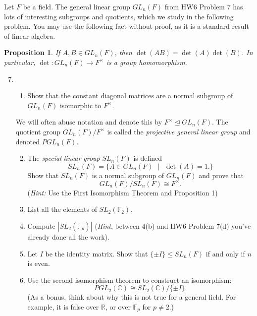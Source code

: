 \documentclass[11pt]{article}
\newtheorem{proposition}{Proposition}
\newcommand{\bC}{\mathbb{C}}
\newcommand{\bF}{\mathbb{F}}
\newcommand{\bR}{\mathbb{R}}
\begin{document}
 Let $F$ be a field.  The general linear group $GL_n(F)$ from HW6 Problem 7 has lots of interesting subgroups and quotients, which we study in the following problem.  You may use the following fact without proof, as it is a standard result of linear algebra.
 \begin{proposition}
  If $A,B\in GL_n(F)$, then $\det(AB)=\det(A)\det(B)$.  In particular, $\det:GL_n(F)\to F^\times$ is a group homomorphism.
\end{proposition}
\begin{enumerate}
\setcounter{enumi}{6}
   \item
  \begin{enumerate}
    \item Show that the constant diagonal matrices are a normal subgroup of $GL_n(F)$ isomorphic to $F^\times$.
  \end{enumerate}
  We will often abuse notation and denote this by $F^\times\unlhd GL_n(F)$.  The quotient group $GL_n(F)/F^\times$ is called the \textit{projective general linear group} and denoted $PGL_n(F)$.
  \begin{enumerate}
    \setcounter{enumii}{1}
    \item The \textit{special linear group} $SL_n(F)$ is defined
    \[SL_n(F) = \{A\in GL_n(F)\text{ }|\text{ }\det(A) = 1.\}\]
    Show that $SL_n(F)$ is a normal subgroup of $GL_n(F)$ and prove that
    \[GL_n(F)/SL_n(F)\cong F^\times.\]
    (\textit{Hint:} Use the First Isomorphism Theorem and Proposition 1)
    \item List all the elements of $SL_2(\bF_2)$.
    \item Compute $|SL_2(\bF_p)|$  (\textit{Hint}, between 4(b) and HW6 Problem 7(d) you've already done all the work).
    \item Let $I$ be the identity matrix.  Show that $\{\pm I\}\le SL_n(F)$ if and only if $n$ is even.
    \item Use the second isomorphism theorem to construct an isomorphism:
    \[PGL_2(\bC)\cong SL_2(\bC)/\{\pm I\}.\]
    (As a bonus, think about why this is not true for a general field.  For example, it is false over $\bR$, or over $\bF_p$ for $p\not=2$.)
  \end{enumerate}
\end{enumerate}
\end{document}
